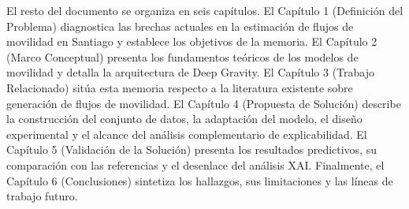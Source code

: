 El resto del documento se organiza en seis capítulos. El Capítulo 1 (Definición del Problema) diagnostica las brechas actuales en la estimación de flujos de movilidad en Santiago y establece los objetivos de la memoria. El Capítulo 2 (Marco Conceptual) presenta los fundamentos teóricos de los modelos de movilidad y detalla la arquitectura de Deep Gravity. El Capítulo 3 (Trabajo Relacionado) sitúa esta memoria respecto a la literatura existente sobre generación de flujos de movilidad. El Capítulo 4 (Propuesta de Solución) describe la construcción del conjunto de datos, la adaptación del modelo, el diseño experimental y el alcance del análisis complementario de explicabilidad. El Capítulo 5 (Validación de la Solución) presenta los resultados predictivos, su comparación con las referencias y el desenlace del análisis XAI. Finalmente, el Capítulo 6 (Conclusiones) sintetiza los hallazgos, sus limitaciones y las líneas de trabajo futuro.
